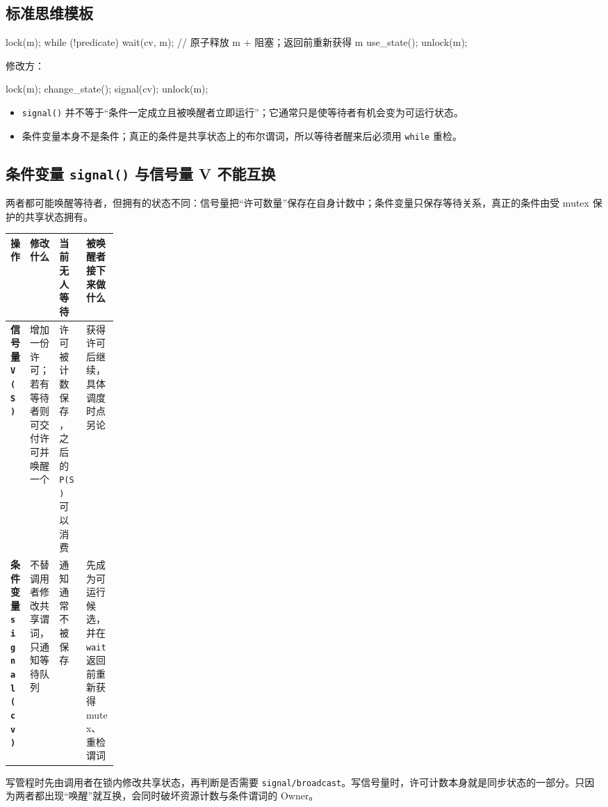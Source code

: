 \documentclass[11pt,a4paper]{ctexart}
\newcommand{\code}[1]{\texttt{#1}}
\begin{document}
\subsection{标准思维模板}

\begin{codeblock}
lock(m);
while (!predicate)
    wait(cv, m);   // 原子释放 m + 阻塞；返回前重新获得 m
use_state();
unlock(m);
\end{codeblock}

修改方：
\begin{codeblock}
lock(m);
change_state();
signal(cv);
unlock(m);
\end{codeblock}

\begin{warn}[两个必须纠正的直觉]
\begin{itemize}
\item \code{signal()} 并不等于“条件一定成立且被唤醒者立即运行”；它通常只是使等待者有机会变为可运行状态。
\item 条件变量本身不是条件；真正的条件是共享状态上的布尔谓词，所以等待者醒来后必须用 \code{while} 重检。
\end{itemize}
\end{warn}

\subsection{条件变量 \code{signal()} 与信号量 V 不能互换}

两者都可能唤醒等待者，但拥有的状态不同：信号量把“许可数量”保存在自身计数中；条件变量只保存等待关系，真正的条件由受 mutex 保护的共享状态拥有。

\begingroup
\small
\renewcommand{\arraystretch}{1.25}
\setlength{\tabcolsep}{5pt}
\begin{tabularx}{\linewidth}{>{\bfseries}p{0.18\linewidth} X X X}
\toprule
操作 & 修改什么 & 当前无人等待 & 被唤醒者接下来做什么 \\
\midrule
信号量 \code{V(S)} & 增加一份许可；若有等待者则可交付许可并唤醒一个 & 许可被计数保存，之后的 \code{P(S)} 可以消费 & 获得许可后继续，具体调度时点另论 \\
条件变量 \code{signal(cv)} & 不替调用者修改共享谓词，只通知等待队列 & 通知通常不被保存 & 先成为可运行候选，并在 \code{wait} 返回前重新获得 mutex、重检谓词 \\
\bottomrule
\end{tabularx}
\endgroup

\begin{method}[稳定推理顺序]
写管程时先由调用者在锁内修改共享状态，再判断是否需要 \code{signal/broadcast}。写信号量时，许可计数本身就是同步状态的一部分。只因为两者都出现“唤醒”就互换，会同时破坏资源计数与条件谓词的 Owner。
\end{method}
\end{document}
